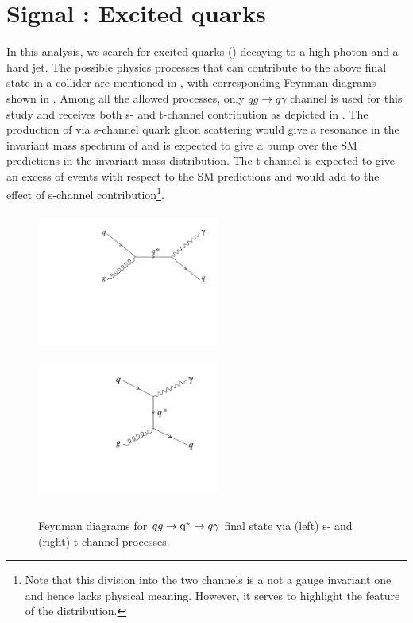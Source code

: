 \section{Signal : Excited quarks}
In this analysis, we search for excited quarks (\qstar) decaying to a high \pt photon and a hard jet. 
The possible physics processes that can contribute to the above final state in a \pp collider are mentioned in \sectn{\ref{Se:qstarTheory}},
with corresponding Feynman diagrams shown in \fig{\ref{fig:qstarSig}}. Among all the allowed processes, only $qg\rightarrow{q\gamma}$ channel
is used for this study and receives both s- and t-channel contribution as depicted in \fig{\ref{fig:qgToqstar}}. The production of \qstar via 
s-channel quark gluon scattering would give a resonance in the invariant mass spectrum of \gamjet and is expected to give a bump over the SM 
predictions in the \gamjet invariant mass distribution. The t-channel is expected to give an excess of events with respect to the SM predictions 
and would add to the effect of s-channel contribution\footnote{Note that this division into the two channels is a not a gauge invariant one and
hence lacks physical meaning. However, it serves to highlight the feature of the distribution.}. 
\begin{figure}[!h]
\centering
 \includegraphics[width=6cm,height=4.5cm]{ch5/plots/FeynmanDiag/qgQstarqgamma_S.pdf}
 \includegraphics[width=6cm,height=5cm]{ch5/plots/FeynmanDiag/qgQstarqgamma_T.pdf}
 \caption{Feynman diagrams for $qg\rightarrow\mathrm{q^\star}\rightarrow{q\gamma}$ final state via (left) s- and (right) t-channel processes.}
\label{fig:qgToqstar}
\end{figure}


